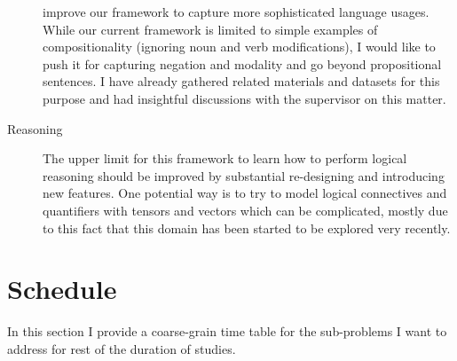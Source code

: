 \begin{description}
improve our framework to capture more sophisticated language usages. While our current framework is limited to simple examples of compositionality (ignoring noun and verb modifications), I would
like to push it for capturing negation and modality and go beyond propositional sentences. I have already gathered related
materials and datasets for this purpose and had insightful discussions with the
supervisor on this matter.
  \item[Reasoning] The upper limit
for this framework to learn how to perform logical reasoning should be improved
by substantial re-designing and introducing new features. One potential way is
to try to model logical connectives and quantifiers with tensors and vectors
which can be complicated, mostly due to this fact that this domain has been
started to be explored very recently.

\end{description}

\section{Schedule}
\label{sec:sch}

In this section I provide a coarse-grain time table for the sub-problems I want
to address for rest of the duration of studies.

